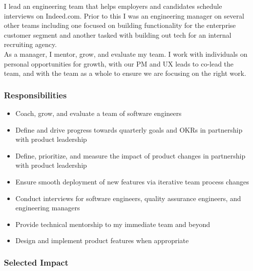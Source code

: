 \documentclass[11pt]{amsart}
\begin{document}
% 
%
\begin{tcolorbox}[
	title=Software Engineering Manager \textcolor{DarkGray}{/} Indeed,
	after title={\hfill2019 \textcolor{DarkGray}{$\rightarrow$} Present \textcolor{DarkGray}{(5 years)}}
]

I lead an engineering team that helps employers and candidates schedule interviews on Indeed.com. Prior to this I was an engineering manager on several other teams including one focused on building functionality for the enterprise customer segment and another tasked with building out tech for an internal recruiting agency.\\

As a manager, I mentor, grow, and evaluate my team. I work with individuals on personal opportunities for growth, with our PM and UX leads to co-lead the team, and with the team as a whole to ensure we are focusing on the right work.

\subsubsection{Responsibilities}

\begin{itemize}[noitemsep, leftmargin=2em, label=\raisebox{0.25ex}{\tiny$\bullet$}]
	\item Coach, grow, and evaluate a team of software engineers
	\item Define and drive progress towards quarterly goals and \textsc{OKR}s in partnership with product leadership
	\item Define, prioritize, and measure the impact of product changes in partnership with product leadership
	\item Ensure smooth deployment of new features via iterative team process changes
	\item Conduct interviews for software engineers, quality assurance engineers, and engineering managers
	\item Provide technical mentorship to my immediate team and beyond
	\item Design and implement product features when appropriate
\end{itemize}

\subsubsection{Selected Impact}


\end{tcolorbox}
\end{document}
